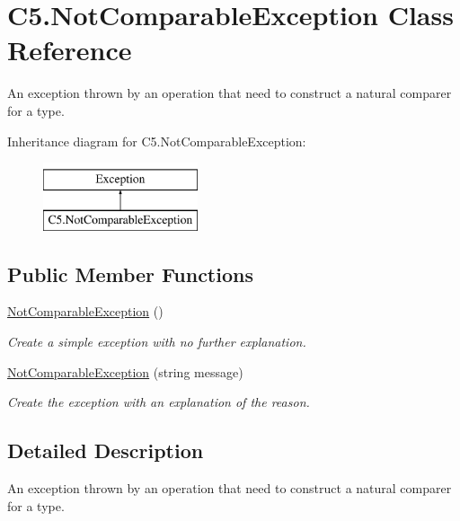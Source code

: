 \hypertarget{class_c5_1_1_not_comparable_exception}{}\section{C5.\+Not\+Comparable\+Exception Class Reference}
\label{class_c5_1_1_not_comparable_exception}


An exception thrown by an operation that need to construct a natural comparer for a type.  


Inheritance diagram for C5.\+Not\+Comparable\+Exception\+:\begin{figure}[H]
\begin{center}
\leavevmode
\includegraphics[height=2.000000cm]{class_c5_1_1_not_comparable_exception}
\end{center}
\end{figure}
\subsection*{Public Member Functions}
\begin{DoxyCompactItemize}
\item 
\hyperlink{class_c5_1_1_not_comparable_exception_afbdf8124b21ca67758244b882f26004e}{Not\+Comparable\+Exception} ()
\begin{DoxyCompactList}\small\item\em Create a simple exception with no further explanation. \end{DoxyCompactList}\item 
\hyperlink{class_c5_1_1_not_comparable_exception_acf729013c7ee07f2dd494936ac56ddda}{Not\+Comparable\+Exception} (string message)
\begin{DoxyCompactList}\small\item\em Create the exception with an explanation of the reason. \end{DoxyCompactList}\end{DoxyCompactItemize}


\subsection{Detailed Description}
An exception thrown by an operation that need to construct a natural comparer for a type. 



